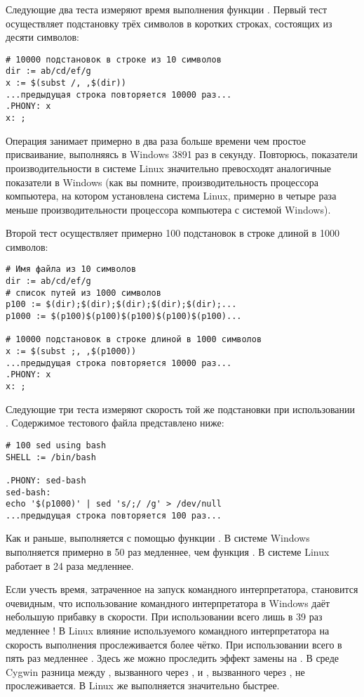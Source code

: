 Следующие два теста измеряют время выполнения функции .
Первый тест осуществляет подстановку трёх символов в коротких строках,
состоящих из десяти символов:

{\footnotesize
\begin{verbatim}
# 10000 подстановок в строке из 10 символов
dir := ab/cd/ef/g
x := $(subst /, ,$(dir))
...предыдущая строка повторяется 10000 раз...
.PHONY: x
x: ;
\end{verbatim}
}

Операция занимает примерно в два раза больше времени чем простое
присваивание, выполняясь в Windows 3891 раз в секунду. Повторюсь,
показатели производительности в системе Linux значительно превосходят
аналогичные показатели в Windows (как вы помните, производительность
процессора компьютера, на котором установлена система Linux, примерно
в четыре раза меньше производительности процессора компьютера с
системой Windows).

Второй тест осуществляет примерно 100 подстановок в строке длиной в
1000 символов:

{\footnotesize
\begin{verbatim}
# Имя файла из 10 символов
dir := ab/cd/ef/g
# список путей из 1000 символов
p100 := $(dir);$(dir);$(dir);$(dir);$(dir);...
p1000 := $(p100)$(p100)$(p100)$(p100)$(p100)...

# 10000 подстановок в строке длиной в 1000 символов
x := $(subst ;, ,$(p1000))
...предыдущая строка повторяется 10000 раз...
.PHONY: x
x: ;
\end{verbatim}
}

Следующие три теста измеряют скорость той же подстановки при
использовании . Содержимое тестового файла представлено
ниже:

{\footnotesize
\begin{verbatim}
# 100 sed using bash
SHELL := /bin/bash

.PHONY: sed-bash
sed-bash:
echo '$(p1000)' | sed 's/;/ /g' > /dev/null
...предыдущая строка повторяется 100 раз...
\end{verbatim}
}

Как и раньше, \makefile{} выполняется с помощью функции
. В системе Windows  выполняется
примерно в 50 раз медленнее, чем функция . В системе
Linux  работает в 24 раза медленнее.

Если учесть время, затраченное на запуск командного интерпретатора,
становится очевидным, что использование командного интерпретатора
 в Windows даёт небольшую прибавку в скорости. При
использовании   всего лишь в 39 раз
медленнее ! В Linux влияние используемого командного
интерпретатора на скорость выполнения прослеживается более чётко. При
использовании   всего в пять раз медленнее
. Здесь же можно проследить эффект замены
 на . В среде Cygwin разница между
, вызванного через , и
, вызванного через , не
прослеживается. В Linux же  выполняется значительно
быстрее.

